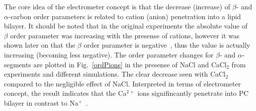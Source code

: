 \documentclass[pre,aps,floatfix,authordate1-4,twocolumn]{revtex4-1}
\begin{document}


The core idea of the electrometer concept is that the decrease (increase) of $\beta$- and $\alpha$-carbon order parameters
is related to cation (anion) penetration into a lipid bilayer. 
It should be noted that in the original experiments the absolute value of $\beta$ order parameter was increasing with the presense of cations,
however it was shown later on that the $\beta$ order parameter is negative~\cite{hong95a,hong95b,gross97}, 
thus the value is actually increasing (becoming less negative).
The order parameter changes for  $\beta$- and $\alpha$-segments 
are plotted in Fig.~\ref{ordPions} in the presense of NaCl and CaCl$_2$ from experiments and different simulations. 
The clear decrease seen with CaCl$_2$ compared to the negligible effect of NaCl. Interpreted in terms of
electrometer concept, the result indicates that the Ca$^{2+}$ ions signifincantly penetrate into PC bilayer in contrast to 
Na$^+$~\cite{akutsu81,altenbach84}.
\end{document}
